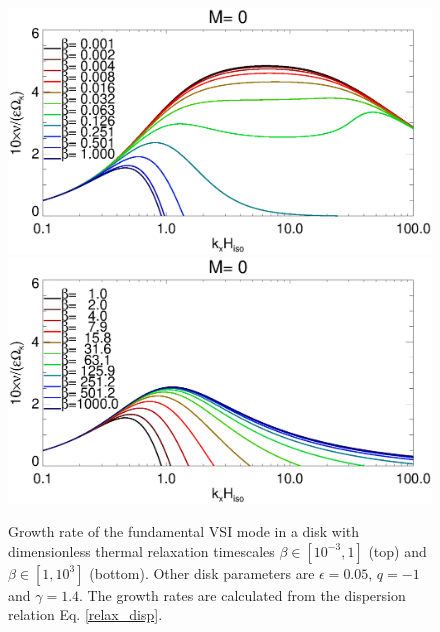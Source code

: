 \begin{figure}
  \includegraphics[width=\linewidth,clip=true,trim=0cm 1.75cm 0cm 0cm]{figures/rate_theory_grow_relax}
  \includegraphics[width=\linewidth,clip=true,trim=0cm 0cm 0cm 1cm]{figures/rate_theory_grow_relax2}
  \caption{Growth rate of the fundamental VSI mode in a disk with
    dimensionless thermal relaxation timescales
    $\beta\in[10^{-3},1]$ (top) and $\beta\in[1,10^3]$ (bottom).
Other disk parameters are
    $\epsilon=0.05$, $q=-1$ and $\gamma=1.4$. The growth rates are
    calculated from the dispersion relation Eq. \ref{relax_disp}. 
    \label{relax_disp_fig}}  
\end{figure}   


